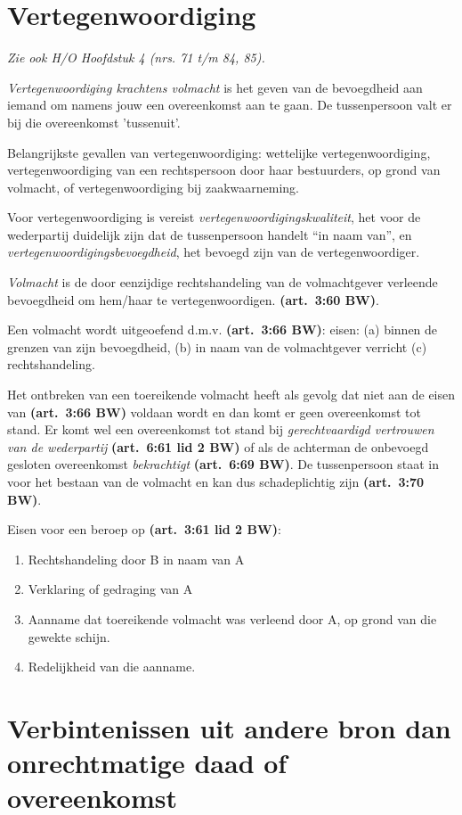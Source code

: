 \documentclass[a4paper]{article}
\newcommand{\art}[1]{\textbf{(art.~#1 BW)}\xspace}
\begin{document}
\section{Vertegenwoordiging} \label{sec:vertegenwoordiging}

\emph{Zie ook H/O Hoofdstuk 4 (nrs. 71 t/m 84, 85).}

\emph{Vertegenwoordiging krachtens volmacht} is het geven van de bevoegdheid
aan iemand om namens jouw een overeenkomst aan te gaan. De tussenpersoon valt
er bij die overeenkomst 'tussenuit'.

Belangrijkste gevallen van vertegenwoordiging: wettelijke vertegenwoordiging,
vertegenwoordiging van een rechtspersoon door haar bestuurders, op grond van
volmacht, of vertegenwoordiging bij zaakwaarneming.

Voor vertegenwoordiging is vereist \emph{vertegenwoordigingskwaliteit}, het
voor de wederpartij duidelijk zijn dat de tussenpersoon handelt ``in naam
van'', en \emph{vertegenwoordigingsbevoegdheid}, het bevoegd zijn van de
vertegenwoordiger.

\emph{Volmacht} is de door eenzijdige rechtshandeling van de volmachtgever
verleende bevoegdheid om hem/haar te vertegenwoordigen. \art{3:60}.

Een volmacht wordt uitgeoefend d.m.v. \art{3:66}: eisen: (a) binnen de grenzen
van zijn bevoegdheid, (b) in naam van de volmachtgever verricht (c)
rechtshandeling.

Het ontbreken van een toereikende volmacht heeft als gevolg dat niet aan de
eisen van \art{3:66} voldaan wordt en dan komt er geen overeenkomst tot stand.
Er komt wel een overeenkomst tot stand bij \emph{gerechtvaardigd vertrouwen
van de wederpartij} \art{6:61 lid 2} of als de achterman de onbevoegd gesloten
overeenkomst \emph{bekrachtigt} \art{6:69}. De tussenpersoon staat in voor het
bestaan van de volmacht en kan dus schadeplichtig zijn \art{3:70}.

Eisen voor een beroep op \art{3:61 lid 2}:
\begin{enumerate}
  \item Rechtshandeling door B in naam van A
  \item Verklaring of gedraging van A
  \item Aanname dat toereikende volmacht was verleend door A, op grond van die
    gewekte schijn.
  \item Redelijkheid van die aanname.
\end{enumerate}


\section{Verbintenissen uit andere bron dan onrechtmatige daad of overeenkomst}
\end{document}
